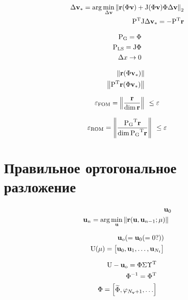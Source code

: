 \begin{align}
    \dvunk_\ast = \arg \min_{\dvunk} \norm[2]{\resid(\Phi \vunk) + \jac(\Phi \vunk) \Phi \dvunk} \\
    \transpose{P}\jac \dvunk_\ast = - \transpose{P} \resid
\end{align}

\begin{align}
    \matr{P}_\text{G} = \Phi \\
    \matr{P}_\text{LS} = \jac \Phi \\
    \Delta x \rightarrow 0
\end{align}

\begin{align}
    \norm{\resid(\Phi \vunk_\ast)} \\
    \norm{\transpose{P}\resid(\Phi \vunk_\ast)}
\end{align}

\begin{equation}
    \varepsilon_\text{FOM} = \left\| \frac{\mathbf{r}}{\dim{\mathbf{r}}} \right\|_{~} \leq \varepsilon \\
\end{equation}

\begin{equation}
    \varepsilon_\text{ROM} = \norm{\frac{\transpose{\matr{P}_\text{G}}\resid}{\dim{ \transpose{\matr{P}_\text{G}}\resid}}} \leq \varepsilon
\end{equation}

\section{Правильное ортогональное разложение}

\begin{align}
    \mathbf{u}_0 \\
    \mathbf{u}_n = \arg \min_{\mathbf{u}} \left\| \mathbf{r}(\mathbf{u},\mathbf{u}_{n-1};\mathbf{\mu}) \right\|_{~}
\end{align}

\begin{align}
    \unk_\text{o} (= \unk_0 (= 0 ?)) \\
    \matr{U} (\param) =
    \begin{bmatrix}
        \unk_0, \unk_1, \dots, \unk_{N_t}
    \end{bmatrix}
\end{align}

\begin{align}
    \matr{u} - \unk_\text{o} = \Phi \Sigma \transpose{\Upsilon} \\
    \Phi^{-1} = \transpose{\Phi} \\
    \Phi = \begin{bmatrix}
        \widetilde{\Phi}, \pc[N_\vunk + 1], \dots
    \end{bmatrix}
\end{align}

